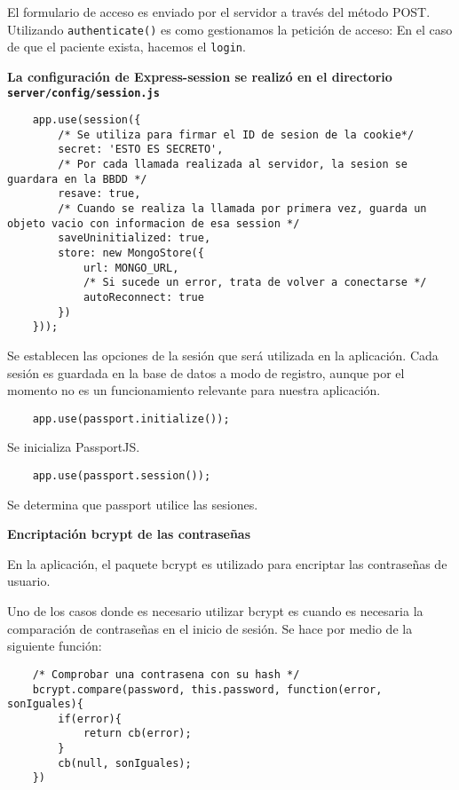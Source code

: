 El formulario de acceso es enviado por el servidor a través del método POST. Utilizando \texttt{authenticate()} es como gestionamos la petición de acceso: En el caso de que el paciente exista, hacemos el \texttt{login}.\newline


\textbf{La configuración de Express-session se realizó en el directorio \\ \texttt{server/config/session.js}}


\medskip
\begin{lstlisting}
	app.use(session({
		/* Se utiliza para firmar el ID de sesion de la cookie*/
		secret: 'ESTO ES SECRETO',
		/* Por cada llamada realizada al servidor, la sesion se guardara en la BBDD */
		resave: true,
		/* Cuando se realiza la llamada por primera vez, guarda un objeto vacio con informacion de esa session */
		saveUninitialized: true,
		store: new MongoStore({
			url: MONGO_URL,
			/* Si sucede un error, trata de volver a conectarse */
			autoReconnect: true
		})
	}));
\end{lstlisting}


Se establecen las opciones de la sesión que será utilizada en la aplicación. Cada sesión es guardada en la base de datos a modo de registro, aunque por el momento no es un funcionamiento relevante para nuestra aplicación.


\medskip
\begin{lstlisting}
	app.use(passport.initialize());
\end{lstlisting}


Se inicializa PassportJS.


\medskip
\begin{lstlisting}
	app.use(passport.session());
\end{lstlisting}


Se determina que passport utilice las sesiones.\newline


\textbf{Encriptación bcrypt de las contraseñas}


En la aplicación, el paquete bcrypt es utilizado para encriptar las contraseñas de usuario.


Uno de los casos donde es necesario utilizar bcrypt es cuando es necesaria la comparación de contraseñas en el inicio de sesión. Se hace por medio de la siguiente función:


\medskip
\begin{lstlisting}
	/* Comprobar una contrasena con su hash */ 
	bcrypt.compare(password, this.password, function(error, sonIguales){ 
		if(error){ 
			return cb(error); 
		} 
		cb(null, sonIguales); 
	}) 
\end{lstlisting}


